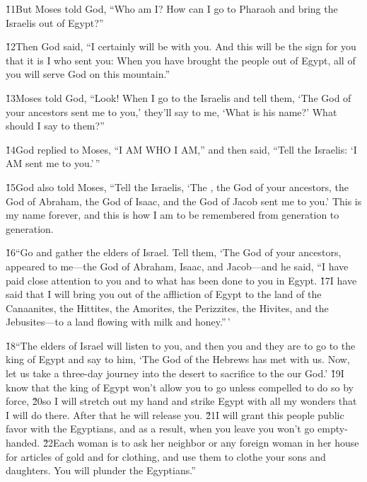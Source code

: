 \v{11}But Moses told God, ``Who am I? How can I go to Pharaoh and bring the Israelis out of Egypt?''

\v{12}Then God said, ``I certainly will be with you. And this will be the sign for you that it is I who sent you: When you have brought the people out of Egypt, all of you will serve God on this mountain.''

\v{13}Moses told God, ``Look! When I go to the Israelis and tell them, `The God of your ancestors sent me to you,' they'll say to me, `What is his name?' What should I say to them?''

\v{14}God replied to Moses, ``I AM WHO I AM,'' and then said, ``Tell the Israelis: `I AM sent me to you.'\,''

\v{15}God also told Moses, ``Tell the Israelis, `The , the God of your ancestors, the God of Abraham, the God of Isaac, and the God of Jacob sent me to you.' This is my name forever, and this is how I am to be remembered from generation to generation.

\v{16}``Go and gather the elders of Israel. Tell them, `The  God of your ancestors, appeared to me---the God of Abraham, Isaac, and Jacob---and he said, ``I have paid close attention to you and to what has been done to you in Egypt. \v{17}I have said that I will bring you out of the affliction of Egypt to the land of the Canaanites, the Hittites, the Amorites, the Perizzites, the Hivites, and the Jebusites---to a land flowing with milk and honey.''\,'

\v{18}``The elders of Israel will listen to you, and then you and they are to go to the king of Egypt and say to him, `The  God of the Hebrews has met with us. Now, let us take a three-day journey into the desert to sacrifice to the  our God.' \v{19}I know that the king of Egypt won't allow you to go unless compelled to do so by force, \v{20}so I will stretch out my hand and strike Egypt with all my wonders that I will do there. After that he will release you. \v{21}I will grant this people public favor with the Egyptians, and as a result, when you leave you won't go empty-handed. \v{22}Each woman is to ask her neighbor or any foreign woman in her house for articles of gold and for clothing, and use them to clothe your sons and daughters. You will plunder the Egyptians.''

